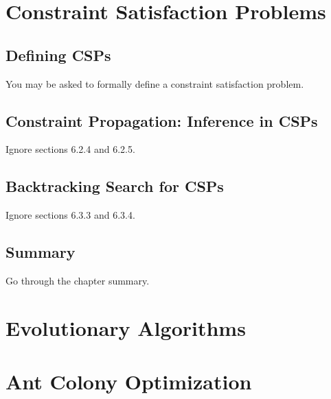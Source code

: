 \documentclass[exam={Midterm}]{cs581exam}
\begin{document}
\section{Constraint Satisfaction Problems}\label{sec:constraint-satisfaction-problems}
\subsection{Defining CSPs}\label{subsec:6.1}
You may be asked to formally define a constraint satisfaction problem.
\subsection{Constraint Propagation: Inference in CSPs}\label{subsec:6.2}
Ignore sections 6.2.4 and 6.2.5.
\subsection{Backtracking Search for CSPs}\label{subsec:6.3}
Ignore sections 6.3.3 and 6.3.4.
\subsection{Summary}\label{subsec:6-summary}
Go through the chapter summary.

\section{Evolutionary Algorithms}\label{sec:evolutionary-algorithms}

\section{Ant Colony Optimization}\label{sec:ant-colony-optimization}
\end{document}

